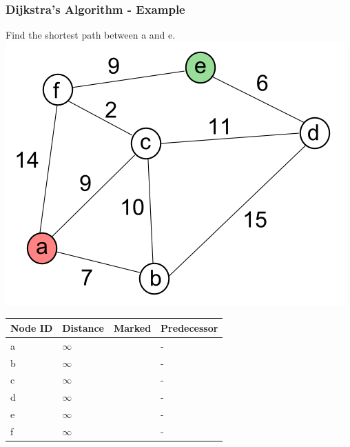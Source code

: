 \begin{frame}[fragile]
\frametitle{Dijkstra's Algorithm - Example}
Find the shortest path between a and e.\\
\vspace{3mm}
\includegraphics[scale=0.2]{img/dijkstra.png}
\vspace{3mm}
{\tiny
\begin{tabular}{l|l|l|l}
Node ID & Distance & Marked & Predecessor\\
\hline
a & $\infty$ & & -\\
b & $\infty$ & & -\\
c & $\infty$ & & -\\
d & $\infty$ & & -\\
e & $\infty$ & & -\\
f & $\infty$ & & -\\
\end{tabular}
}
\end{frame}


